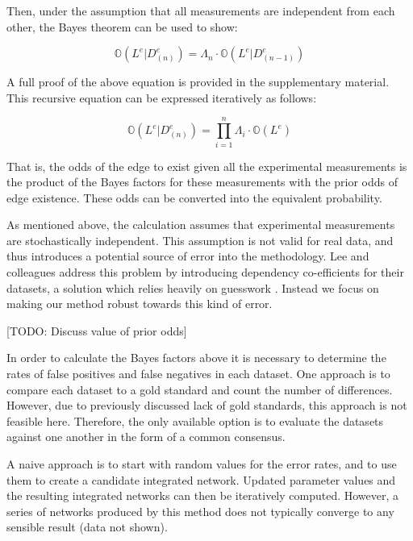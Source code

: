 \documentclass{bioinfo}
\newcommand{\odds}{\mathbb{O}}
\newcommand{\note}[1]{{\color{red}[#1]}}
\begin{document}
\begin{methods}
Then, under the assumption that all measurements are independent from each other, the Bayes theorem can be used to show:

\begin{equation} 
	\odds(L^e|D^e_{(n)}) = \Lambda_n \cdot \odds(L^e|D^e_{(n-1)})
\end{equation}

A full proof of the above equation is provided in the supplementary material. This recursive equation can be expressed iteratively as follows:

\begin{equation} 
	\odds(L^e|D^e_{(n)}) = \prod_{i=1}^n \Lambda_i \cdot \odds(L^e)
\end{equation}

That is, the odds of the edge to exist given all the experimental measurements is the product of the Bayes factors for these measurements with the prior odds of edge existence. These odds can be converted into the equivalent probability. 

As mentioned above, the calculation assumes that experimental measurements are stochastically independent. This assumption is not valid for real data, and thus introduces a potential source of error into the methodology. Lee and colleagues address this problem by introducing dependency co-efficients for their datasets, a solution which relies heavily on guesswork \citep{lee_probabilistic_2004}. Instead we focus on making our method robust towards this kind of error. 

\note{TODO: Discuss value of prior odds}

In order to calculate the Bayes factors above it is necessary to determine the rates of false positives and false negatives in each dataset. One approach is to compare each dataset to a gold standard and count the number of differences. However, due to previously discussed lack of gold standards, this approach is not feasible here. Therefore, the only available option is to evaluate the datasets against one another in the form of a common consensus. 

A naive approach is to start with random values for the error rates, and to use them to create a candidate integrated network. Updated parameter values and the resulting integrated networks can then be iteratively computed. However, a series of networks produced by this method does not typically converge to any sensible result (data not shown).


\end{methods}
\end{document}
